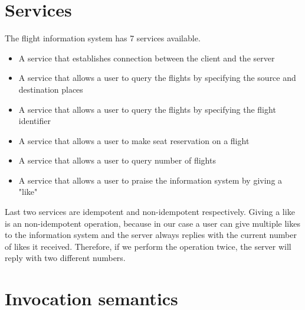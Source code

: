 \documentclass[12pt,a4paper]{article}
\begin{document}
\section{Services}
The flight information system has 7 services available.
\renewcommand\labelitemi{\tiny$\bullet$}
\begin{itemize}
    \setlength\itemsep{0.15em}
	\item A service that establishes connection between the client and the server
	\item A service that allows a user to query the flights by specifying the source and destination places
	\item A service that allows a user to query the flights by specifying the flight identifier
    \item A service that allows a user to make seat reservation on a flight
    \item A service that allows a user to query number of flights
    \item A service that allows a user to praise the information system by giving a "like"
\end{itemize}
Last two services are idempotent and non-idempotent respectively. Giving a like is an non-idempotent operation, because in our case a user can give multiple likes to the information system and the server always replies with the current number of likes it received. Therefore, if we perform the operation twice, the server will reply with two different numbers.

\section{Invocation semantics}
\end{document}
